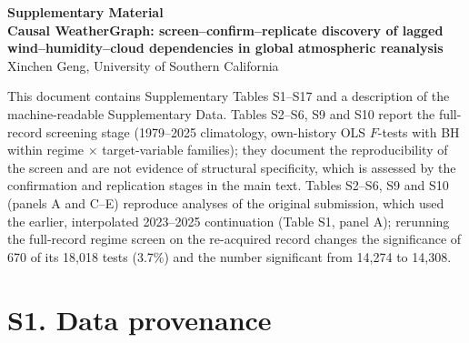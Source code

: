 \documentclass[11pt]{article}
\begin{document}
\begin{center}
{\large\bfseries Supplementary Material}\\[4pt]
{\bfseries Causal WeatherGraph: screen--confirm--replicate discovery of lagged wind--humidity--cloud dependencies in global atmospheric reanalysis}\\[4pt]
Xinchen Geng, University of Southern California
\end{center}

\noindent This document contains Supplementary Tables S1--S17 and a description of the machine-readable Supplementary Data. Tables S2--S6, S9 and S10 report the full-record screening stage (1979--2025 climatology, own-history OLS $F$-tests with BH within regime $\times$ target-variable families); they document the reproducibility of the screen and are not evidence of structural specificity, which is assessed by the confirmation and replication stages in the main text. Tables S2--S6, S9 and S10 (panels A and C--E) reproduce analyses of the original submission, which used the earlier, interpolated 2023--2025 continuation (Table S1, panel A); rerunning the full-record regime screen on the re-acquired record changes the significance of 670 of its 18,018 tests (3.7\%) and the number significant from 14,274 to 14,308.

\section*{S1. Data provenance}
\end{document}
